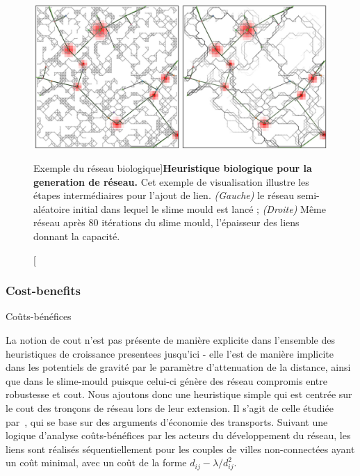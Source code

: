 \begin{figure}
\includegraphics[width=\linewidth]{Figures/Final/7-1-1-fig-networkgrowth-bioexample.jpg}
\caption[Biological Network Example][Exemple du réseau biologique]{}{\textbf{Heuristique biologique pour la generation de réseau.} Cet exemple de visualisation illustre les étapes intermédiaires pour l'ajout de lien. \textit{(Gauche)} le réseau semi-aléatoire initial dans lequel le slime mould est lancé ; \textit{(Droite)} Même réseau après 80 itérations du slime mould, l'épaisseur des liens donnant la capacité.\label{fig:networkgrowth:bioexample}}
\end{figure}


\subsubsection{Cost-benefits}{Coûts-bénéfices}

La notion de cout n'est pas présente de manière explicite dans l'ensemble des heuristiques de croissance presentees jusqu'ici - elle l'est de manière implicite dans les potentiels de gravité par le paramètre d'attenuation de la distance, ainsi que dans le slime-mould puisque celui-ci génère des réseau compromis entre robustesse et cout. Nous ajoutons donc une heuristique simple qui est centrée sur le cout des tronçons de réseau lors de leur extension. Il s'agit de celle étudiée par~\cite{louf2013emergence}, qui se base sur des arguments d'économie des transports. Suivant une logique d'analyse coûts-bénéfices par les acteurs du développement du réseau, les liens sont réalisés séquentiellement pour les couples de villes non-connectées ayant un coût minimal, avec un coût de la forme $d_{ij} - \lambda / d_{ij}^2$.






